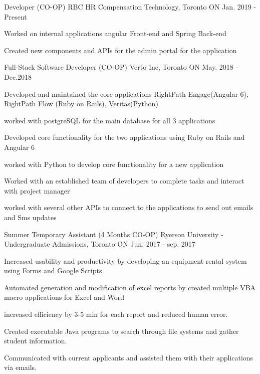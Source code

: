 \vspace*{-3mm}
\begin{cventries}
\cventry
    {Developer (CO-OP)}
    {RBC HR Compensation Technology, Toronto ON}
    {}
    {Jan. 2019 - Present}
    {
      \begin{cvitems}
        \item {Worked on internal applications angular Front-end and Spring Back-end}
        \item {Created new components and APIs for the admin portal for the application}
      \end{cvitems}
    }
    \vspace*{-3mm}
\cventry
    {Full-Stack Software Developer (CO-OP)}
    {Verto Inc, Toronto ON}
    {}
    {May. 2018 - Dec.2018}
    {
      \begin{cvitems}
        \item {Developed and maintained the core applications RightPath Engage(Angular 6), RightPath Flow (Ruby on Rails), Veritas(Python)}
        \item{ worked with postgreSQL for the main database for all 3 applications }
        \item { Developed core functionality for the two applications using Ruby on Rails and Angular 6 }
        \item { worked with Python to develop core functionality for a new application }
        \item { Worked with an established team of developers to complete tasks and interact with project manager }
        \item { worked with several other APIs to connect to the applications to send out emails and Sms updates }
      \end{cvitems}
    }
    \vspace*{-3mm}
  \cventry
    {Summer Temporary Assistant (4 Months CO-OP)}
    {Ryerson University - Undergraduate Admissions, Toronto ON}
    {}
    {Jun. 2017 - sep. 2017}
    {
      \begin{cvitems}
        \item {Increased usability and productivity by developing an equipment rental system using Forms and Google Scripts.}
        \item {Automated generation and modification of excel reports by created multiple VBA macro applications for Excel and Word}
        \item{increased efficiency by 3-5 min for each report and reduced human error.}
        \item {Created executable Java programs to search through file systems and gather student information.}
        \item{Communicated with current applicants and assisted them with their applications via emails.}
      \end{cvitems}
    }
    
 
\end{cventries}
\vspace*{-6mm}